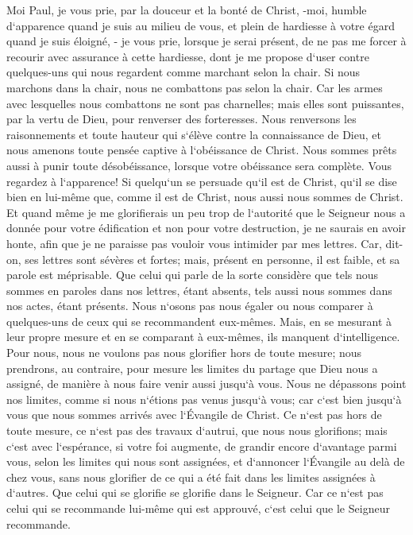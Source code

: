\verse Moi Paul, je vous prie, par la douceur et la bonté de Christ, -moi, humble d`apparence quand je suis au milieu de vous, et plein de hardiesse à votre égard quand je suis éloigné, - 
\verse je vous prie, lorsque je serai présent, de ne pas me forcer à recourir avec assurance à cette hardiesse, dont je me propose d`user contre quelques-uns qui nous regardent comme marchant selon la chair. 
\verse Si nous marchons dans la chair, nous ne combattons pas selon la chair. 
\verse Car les armes avec lesquelles nous combattons ne sont pas charnelles; mais elles sont puissantes, par la vertu de Dieu, pour renverser des forteresses. 
\verse Nous renversons les raisonnements et toute hauteur qui s`élève contre la connaissance de Dieu, et nous amenons toute pensée captive à l`obéissance de Christ. 
\verse Nous sommes prêts aussi à punir toute désobéissance, lorsque votre obéissance sera complète. 
\verse Vous regardez à l`apparence! Si quelqu`un se persuade qu`il est de Christ, qu`il se dise bien en lui-même que, comme il est de Christ, nous aussi nous sommes de Christ. 
\verse Et quand même je me glorifierais un peu trop de l`autorité que le Seigneur nous a donnée pour votre édification et non pour votre destruction, je ne saurais en avoir honte, 
\verse afin que je ne paraisse pas vouloir vous intimider par mes lettres. 
\verse Car, dit-on, ses lettres sont sévères et fortes; mais, présent en personne, il est faible, et sa parole est méprisable. 
\verse Que celui qui parle de la sorte considère que tels nous sommes en paroles dans nos lettres, étant absents, tels aussi nous sommes dans nos actes, étant présents. 
\verse Nous n`osons pas nous égaler ou nous comparer à quelques-uns de ceux qui se recommandent eux-mêmes. Mais, en se mesurant à leur propre mesure et en se comparant à eux-mêmes, ils manquent d`intelligence. 
\verse Pour nous, nous ne voulons pas nous glorifier hors de toute mesure; nous prendrons, au contraire, pour mesure les limites du partage que Dieu nous a assigné, de manière à nous faire venir aussi jusqu`à vous. 
\verse Nous ne dépassons point nos limites, comme si nous n`étions pas venus jusqu`à vous; car c`est bien jusqu`à vous que nous sommes arrivés avec l`Évangile de Christ. 
\verse Ce n`est pas hors de toute mesure, ce n`est pas des travaux d`autrui, que nous nous glorifions; mais c`est avec l`espérance, si votre foi augmente, de grandir encore d`avantage parmi vous, selon les limites qui nous sont assignées, 
\verse et d`annoncer l`Évangile au delà de chez vous, sans nous glorifier de ce qui a été fait dans les limites assignées à d`autres. 
\verse Que celui qui se glorifie se glorifie dans le Seigneur. 
\verse Car ce n`est pas celui qui se recommande lui-même qui est approuvé, c`est celui que le Seigneur recommande. 

